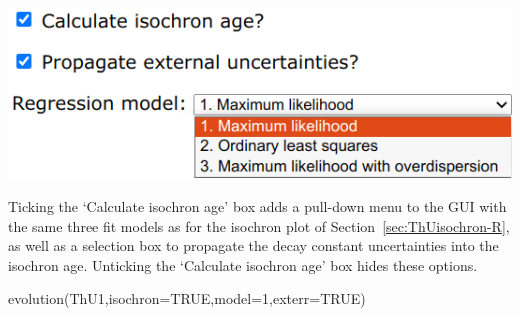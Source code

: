 \begin{refsection}
\begin{enumerate}
  \begin{minipage}[t]{.55\linewidth}
    \strut\vspace*{-\baselineskip}\newline
    \includegraphics[width=\linewidth]{../figures/ThUevolutionIsochron.png}
  \end{minipage}
  \begin{minipage}[t]{.45\linewidth}
    Ticking the `Calculate isochron age' box adds a pull-down menu
    to the GUI with the same three fit models as for the isochron
    plot of Section~\ref{sec:ThUisochron-R}, as well as a selection
    box to propagate the decay constant uncertainties into the
    isochron age. Unticking the `Calculate isochron age' box hides
    these options.
  \end{minipage}

\begin{console}
evolution(ThU1,isochron=TRUE,model=1,exterr=TRUE)
\end{console}


\end{enumerate}
\end{refsection}
